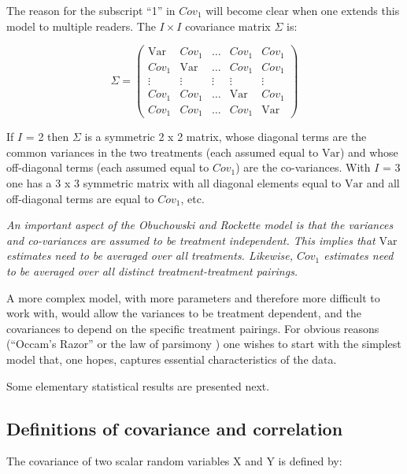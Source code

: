 \documentclass[
]{book}
\begin{document}
The reason for the subscript ``1'' in \(Cov_1\) will become clear when one extends this model to multiple readers. The \(I \times I\) covariance matrix \(\Sigma\) is:

\begin{equation}
\Sigma=
\begin{pmatrix}
\text{Var} & Cov_1   & \ldots & Cov_1 & Cov_1 \\
Cov_1 & \text{Var}   & \ldots &Cov_1 & Cov_1 \\
\vdots & \vdots & \vdots & \vdots & \vdots \\
Cov_1 & Cov_1 & \ldots & \text{Var} & Cov_1 \\
Cov_1 & Cov_1 & \ldots & Cov_1 & \text{Var}
\end{pmatrix}
\label{eq:ExampleSigma}
\end{equation}

If \(I\) = 2 then \(\Sigma\) is a symmetric 2 x 2 matrix, whose diagonal terms are the common variances in the two treatments (each assumed equal to \(\text{Var}\)) and whose off-diagonal terms (each assumed equal to \(Cov_1\)) are the co-variances. With \(I\) = 3 one has a 3 x 3 symmetric matrix with all diagonal elements equal to \(\text{Var}\) and all off-diagonal terms are equal to \(Cov_1\), etc.

\emph{An important aspect of the Obuchowski and Rockette model is that the variances and co-variances are assumed to be treatment independent. This implies that \(\text{Var}\) estimates need to be averaged over all treatments. Likewise, \(Cov_1\) estimates need to be averaged over all distinct treatment-treatment pairings.}

A more complex model, with more parameters and therefore more difficult to work with, would allow the variances to be treatment dependent, and the covariances to depend on the specific treatment pairings. For obvious reasons (``Occam's Razor'' or the law of parsimony ) one wishes to start with the simplest model that, one hopes, captures essential characteristics of the data.

Some elementary statistical results are presented next.

\hypertarget{definitions-of-covariance-and-correlation}{%
\subsection{Definitions of covariance and correlation}\label{definitions-of-covariance-and-correlation}}

The covariance of two scalar random variables X and Y is defined by:
\end{document}
